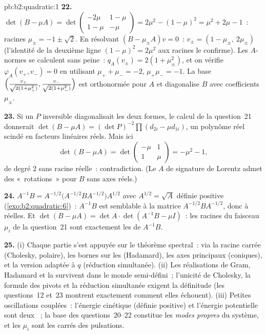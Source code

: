 \begin{solution}{pb:b2:quadratic:1}
\textbf{22.} $\det(B - \mu A) =
\det\begin{pmatrix} -2\mu & 1-\mu\\ 1-\mu & -\mu\end{pmatrix}
= 2\mu^2 - (1-\mu)^2 = \mu^2 + 2\mu - 1$~: racines $\mu_\pm = -1
\pm \sqrt2$. En résolvant $(B - \mu_\pm A)v = 0$~: $v_\pm = (1 -
\mu_\pm,\ 2\mu_\pm)$ (l'identité de la deuxième ligne $(1-\mu)^2 =
2\mu^2$ aux racines le confirme). Les $A$-normes se calculent sans
peine~: $q_A(v_\pm) = 2(1 + \mu_\pm^2)$, et on vérifie
$\varphi_A(v_+, v_-) = 0$ en utilisant $\mu_+ + \mu_- = -2$,
$\mu_+\mu_- = -1$. La base $\Bigl(\frac{v_+}{\sqrt{2(1 +
\mu_+^2)}}, \frac{v_-}{\sqrt{2(1+\mu_-^2)}}\Bigr)$ est
orthonormée pour $A$ et diagonalise $B$ avec coefficients
$\mu_\pm$.

\textbf{23.} Si un $P$ inversible diagonalisait les deux formes,
le calcul de la question~21 donnerait $\det(B - \mu A) = (\det
P)^{-2}\prod(d_{2i} - \mu d_{1i})$, un polynôme réel scindé
en facteurs linéaires réels. Mais ici
\[
\det(B - \mu A) = \det\begin{pmatrix} -\mu & 1\\ 1 &
\mu\end{pmatrix} = -\mu^2 - 1 ,
\]
de degré $2$ sans racine réelle~: contradiction. (Le
$A$ de signature de Lorentz admet des «~rotations~» pour $B$ sans
axes réels.)

\textbf{24.} $A^{-1}B = A^{-1/2}\bigl(A^{-1/2}BA^{-1/2}\bigr)
A^{1/2}$ avec $A^{1/2} = \sqrt A$ définie positive
(\cref{exo:b2:quadratic:6})~: $A^{-1}B$ est semblable à la matrice
\emph{} $A^{-1/2}BA^{-1/2}$, donc  à
 réelles. Et $\det(B - \mu A) = \det A\cdot
\det(A^{-1}B - \mu I)$~: les racines du faisceau $\mu_i$ de la
question~21 sont exactement les  de $A^{-1}B$.

\textbf{25.} (i) Chaque partie s'est appuyée sur le théorème
spectral~: via la racine carrée (Cholesky, polaire), les bornes
sur les  (Hadamard), les axes principaux (coniques),
et la version adaptée à $q$ (réduction simultanée). (ii) Les
réalisations de Gram, Hadamard et la 
survivent dans le monde semi-défini~; l'unicité de Cholesky, la
formule des pivots et la réduction simultanée exigent la définitude
(les questions~12 et~23 montrent exactement comment elles
échouent). (iii) Petites oscillations couplées~: l'énergie
cinétique (définie positive) et l'énergie potentielle sont deux
~; la base des questions~20--22 constitue les
\emph{modes propres} du système, et les $\mu_i$ sont les carrés des
pulsations.
\end{solution}
